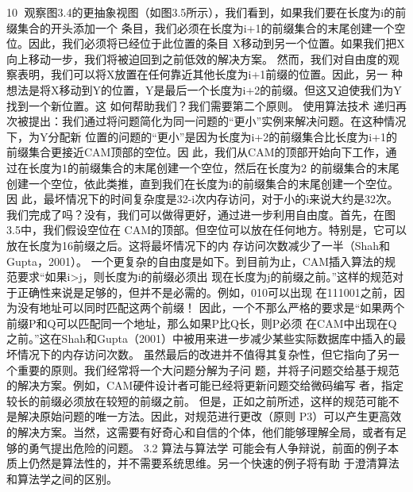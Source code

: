                                                      10
观察图3.4的更抽象视图（如图3.5所示），我们看到，如果我们要在长度为i的前缀集合的开头添加一个
条目，我们必须在长度为i+1的前缀集合的末尾创建一个空位。因此，我们必须将已经位于此位置的条目
X移动到另一个位置。如果我们把X向上移动一步，我们将被迫回到之前低效的解决方案。
然而，我们对自由度的观察表明，我们可以将X放置在任何靠近其他长度为i+1前缀的位置。因此，另一
种想法是将X移动到Y的位置，Y是最后一个长度为i+2的前缀。但这又迫使我们为Y找到一个新位置。这
如何帮助我们？我们需要第二个原则。
使用算法技术
递归再次被提出：我们通过将问题简化为同一问题的“更小”实例来解决问题。在这种情况下，为Y分配新
位置的问题的“更小”是因为长度为i+2的前缀集合比长度为i+1的前缀集合更接近CAM顶部的空位。因
此，我们从CAM的顶部开始向下工作，通过在长度为1的前缀集合的末尾创建一个空位，然后在长度为2
的前缀集合的末尾创建一个空位，依此类推，直到我们在长度为i的前缀集合的末尾创建一个空位。因
此，最坏情况下的时间复杂度是32-i次内存访问，对于小的i来说大约是32次。
我们完成了吗？没有，我们可以做得更好，通过进一步利用自由度。首先，在图3.5中，我们假设空位在
CAM的顶部。但空位可以放在任何地方。特别是，它可以放在长度为16前缀之后。这将最坏情况下的内
存访问次数减少了一半（Shah和Gupta，2001）。
一个更复杂的自由度是如下。到目前为止，CAM插入算法的规范要求“如果i>j，则长度为i的前缀必须出
现在长度为j的前缀之前。”这样的规范对于正确性来说是足够的，但并不是必需的。例如，010可以出现
在111001之前，因为没有地址可以同时匹配这两个前缀！
因此，一个不那么严格的要求是“如果两个前缀P和Q可以匹配同一个地址，那么如果P比Q长，则P必须
在CAM中出现在Q之前。”这在Shah和Gupta（2001）中被用来进一步减少某些实际数据库中插入的最
坏情况下的内存访问次数。
虽然最后的改进并不值得其复杂性，但它指向了另一个重要的原则。我们经常将一个大问题分解为子问
题，并将子问题交给基于规范的解决方案。例如，CAM硬件设计者可能已经将更新问题交给微码编写
者，指定较长的前缀必须放在较短的前缀之前。
但是，正如之前所述，这样的规范可能不是解决原始问题的唯一方法。因此，对规范进行更改（原则
P3）可以产生更高效的解决方案。当然，这需要有好奇心和自信的个体，他们能够理解全局，或者有足
够的勇气提出危险的问题。
3.2 算法与算法学
可能会有人争辩说，前面的例子本质上仍然是算法性的，并不需要系统思维。另一个快速的例子将有助
于澄清算法和算法学之间的区别。

